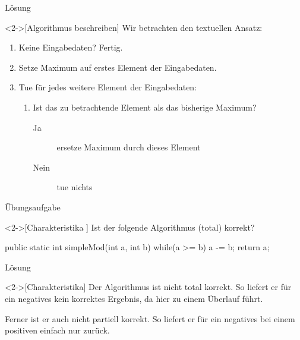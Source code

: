 \begin{frame}[c]{Lösung}
    \begin{solve}<2->[Algorithmus beschreiben]
        \pause{}Wir betrachten den textuellen Ansatz: \begin{enumerate}[<+(1)->]
            \item Keine Eingabedaten?\pause{} Fertig.
            \item Setze Maximum auf erstes Element der Eingabedaten.
            \item Tue für jedes weitere Element der Eingabedaten: \begin{enumerate}
                \item Ist das zu betrachtende Element  als das bisherige Maximum? \begin{description}
                    \item[Ja] ersetze Maximum durch dieses Element
                    \item[Nein] tue nichts
                \end{description}
            \end{enumerate}
        \end{enumerate}
    \end{solve}
\end{frame}

\begin{frame}[c,fragile]{Übungsaufgabe}
    \begin{exercise}<2->[Charakteristika ]
        Ist der folgende Algorithmus (total) korrekt?\pause{}
        \begin{plainjava}
public static int simpleMod(int a, int b){
    while(a >= b)
        a -= b;
    return a;
}
        \end{plainjava}
    \end{exercise}
\end{frame}

\begin{frame}[c]{Lösung}
    \begin{solve}<2->[Charakteristika]
       \pause{}Der Algorithmus ist nicht total korrekt.\pause{} So liefert er für ein negatives  kein korrektes Ergebnis,\pause{} da hier  zu einem Überlauf führt.\pause{}\par{}
       Ferner ist er auch nicht partiell korrekt.\pause{} So liefert er für ein negatives  bei einem positiven  einfach nur  zurück.
    \end{solve}
\end{frame}

